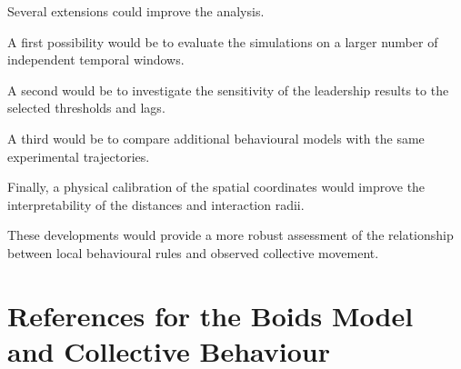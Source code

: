 \documentclass[10pt,a4paper]{article}
\newcommand{\esp}{\vspace*{2\bigskipamount}}
\begin{document}
Several extensions
could improve
the analysis.

A first possibility
would be to evaluate
the simulations
on a larger number
of independent
temporal windows.

A second would be
to investigate the
sensitivity of the
leadership results
to the selected
thresholds and lags.

A third would be
to compare additional
behavioural models
with the same
experimental trajectories.

Finally, a physical
calibration of the
spatial coordinates
would improve the
interpretability
of the distances
and interaction radii.

These developments
would provide a more
robust assessment
of the relationship
between local
behavioural rules
and observed
collective movement.

\esp


\section{References for the Boids Model
and Collective Behaviour}
\label{app:bonus-references}
\end{document}
